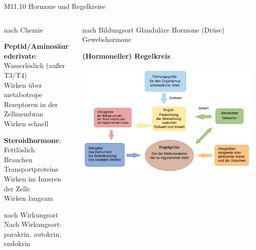 \documentclass{beamer}
\begin{document}
\begin{frame}{M11.10 Hormone und Regelkreise}


\begin{columns}[c]

\begin{column}{5cm}

\begin{block}{nach Chemie}

 \textbf{Peptid/Aminosäurederivate}: \\
 Wasserlöslich (außer T3/T4) \\
 Wirken über metabotrope Rezeptoren in der Zellmembran  \\
 Wirken schnell
 
\textbf{Steroidhormone}: \\
Fettlöslich \\
Brauchen Transportproteine \\
Wirken im Inneren der Zelle \\
Wirken langsam \\


\end{block}

\begin{block}{nach Wirkungsort}
Nach Wirkungsort: parakrin, autokrin, endokrin
\end{block}



\end{column}


\begin{column}{6cm}

\begin{block}{nach Bildungsort}
Glanduläre Hormone (Drüse) \\
Gewebshormone
\end{block}

\pause

\textbf{(Hormoneller) Regelkreis}

\begin{center}
    \includegraphics[width=1.1\textwidth]{regelkreis.png}
\end{center}


\end{column}
\end{columns}
\end{frame}
\end{document}
